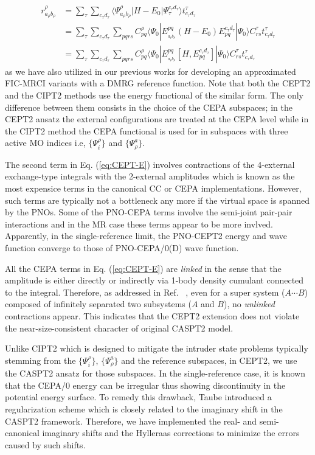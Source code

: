 \documentclass[aip,jcp,amsmath]{revtex4-1}
\begin{document}
%
\begin{align}
  r_{a_\rho b_\rho}^{\rho} &= \sum_{\tau}\sum_{c_\tau d_\tau}\langle\Psi_{a_\rho b_\rho}^{\rho}|H-E_0|\Psi_{\tau}^{c_\tau d_\tau}\rangle t_{c_\tau d_\tau}^\tau \nonumber \\
  &= \sum_{\tau}\sum_{c_\tau d_\tau} \sum_{pqrs} C_{pq}^\rho \langle\Psi_0|E_{_{a_\rho b_\rho}}^{pq}(H-E_0)E_{pq}^{c_\tau d_\tau}|\Psi_0\rangle C_{rs}^\tau t_{c_\tau d_\tau}^\tau \nonumber \\
  &= \sum_{\tau}\sum_{c_\tau d_\tau} \sum_{pqrs} C_{pq}^\rho \langle\Psi_0|E_{_{a_\rho b_\rho}}^{pq}[H,E_{pq}^{c_\tau d_\tau}]|\Psi_0\rangle C_{rs}^\tau t_{c_\tau d_\tau}^\tau \label{eq:comm}
\end{align}
as we have also utilized in our previous works for developing an approximated FIC-MRCI variants with a DMRG reference function.\cite{saitowmultireference2013,doi:10.1021/acs.jctc.5b00270}
%
Note that both the CEPT2 and the CIPT2\cite{celanithe2004} methods use the energy functional of the similar form.
%
The only difference between them consists in the choice of the CEPA subspaces; in the CEPT2 ansatz the external configurations are treated at the CEPA level while in the CIPT2 method the CEPA functional is used for in subspaces with three active MO indices i.e, $\{\Psi_i^\rho\}$ and $\{\Psi_\rho^a\}$.

%
The second term in Eq. (\ref{eq:CEPT-E}) involves contractions of the 4-external exchange-type integrals with the 2-external amplitudes which is known as the most expensice terms in the canonical CC or CEPA implementations.
%
However, such terms are typically not a bottleneck any more if the virtual space is spanned by the PNOs.
%
Some of the PNO-CEPA terms involve the semi-joint pair-pair interactions and in the MR case these terms appear to be more invlved.
%
Apparently, in the single-reference limit, the PNO-CEPT2 energy and wave function converge to those of PNO-CEPA/0(D) wave function.

%
All the CEPA terms in Eq. (\ref{eq:CEPT-E}) are {\it linked} in the sense that the amplitude is either directly or indirectly via 1-body density cumulant connected to the integral.
%
Therefore, as addressed in Ref. ~, even for a super system ($A\cdots B$) composed of infinitely separated two subsystems ($A$ and $B$), no {\it unlinked} contractions appear.
%
This indicates that the CEPT2 extension does not violate the near-size-consistent character of original CASPT2 model.

%
Unlike CIPT2 which is designed to mitigate the intruder state problems typically stemming from the $\{\Psi_i^\rho\}$, $\{\Psi_\rho^a\}$ and the reference subspaces, in CEPT2, we use the CASPT2 ansatz for those subspaces.
%
In the single-reference case, it is known that the CEPA/0 energy can be irregular thus showing discontinuity in the potential energy surface.
%
To remedy this drawback, Taube introduced a regularization scheme which is closely related to the imaginary shift in the CASPT2 framework.\cite{doi:10.1063/1.3115467}
%
Therefore, we have implemented the real- and semi-canonical imaginary shifts and the Hylleraas corrections to minimize the errors caused by such shifts.
\end{document}

